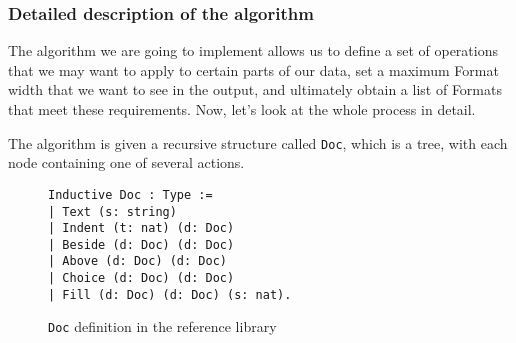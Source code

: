 \documentclass[14pt]{constructor-diploma}
\begin{document}
\label{detailed_description_of_the_algorithm}
\subsubsection{Detailed description of the algorithm}
The algorithm we are going to implement allows us to define a set of operations that we may want to apply to certain parts of our data, 
set a maximum Format width that we want to see in the output, and ultimately obtain a list of Formats that meet these requirements. 
Now, let's look at the whole process in detail.

The algorithm is given a recursive structure called \texttt{Doc}, which is a tree, 
with each node containing one of several actions.

\begin{figure}[H]
\begin{mdframed}[backgroundcolor=bg]
\begin{verbatim}
Inductive Doc : Type :=
| Text (s: string)
| Indent (t: nat) (d: Doc)
| Beside (d: Doc) (d: Doc)
| Above (d: Doc) (d: Doc)
| Choice (d: Doc) (d: Doc)
| Fill (d: Doc) (d: Doc) (s: nat).
\end{verbatim}
\end{mdframed}
\caption{\texttt{Doc} definition in the reference library~\cite{korolihin}}
\end{figure}
\end{document}
